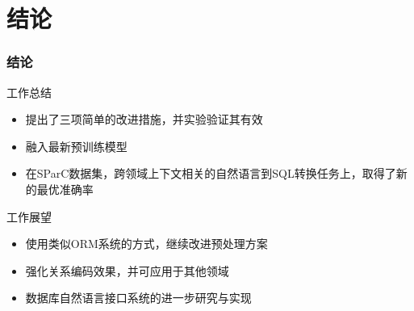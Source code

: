 \documentclass{ctexbeamer}
\begin{document}
\section{结论}
\begin{frame}
  \frametitle{结论}
  \begin{block}{工作总结}
    \begin{itemize}
      \item 提出了三项简单的改进措施，并实验验证其有效
      \item 融入最新预训练模型
      \item 在SParC数据集，跨领域上下文相关的自然语言到SQL转换任务上，取得了新的最优准确率
    \end{itemize}
  \end{block}
  \begin{block}{工作展望}
    \begin{itemize}
      \item 使用类似ORM系统的方式，继续改进预处理方案
      \item 强化关系编码效果，并可应用于其他领域
      \item 数据库自然语言接口系统的进一步研究与实现
    \end{itemize}
  \end{block}
\end{frame}
\end{document}
